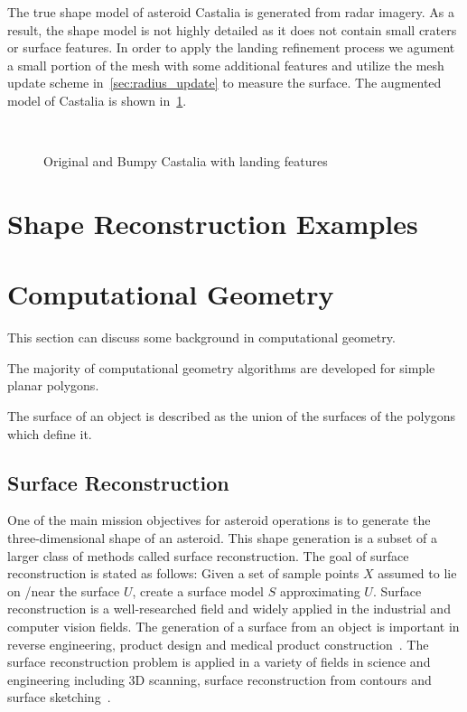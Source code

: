 The true shape model of asteroid Castalia is generated from radar imagery.
As a result, the shape model is not highly detailed as it does not contain small craters or surface features.
In order to apply the landing refinement process we agument a small portion of the mesh with some additional features and utilize the mesh update scheme in~\cref{sec:radius_update} to measure the surface.
The augmented model of Castalia is shown in~\cref{fig:bumpy_castalia}.
\begin{figure}[htbp]
    \centering
    ~
    \caption{Original and Bumpy Castalia with landing features~\label{fig:bumpy_castalia}}
\end{figure}

\section{Shape Reconstruction Examples}





\section{Computational Geometry}

This section can discuss some background in computational geometry.

The majority of computational geometry algorithms are developed for simple planar \glspl{polygon}.

The surface of an object is described as the union of the surfaces of the polygons which define it.


\subsection{Surface Reconstruction}
One of the main mission objectives for asteroid operations is to generate the three-dimensional shape of an asteroid.
This shape generation is a subset of a larger class of methods called surface reconstruction.
The goal of surface reconstruction is stated as follows: Given a set of sample points \( X\) assumed to lie on /near the surface \( U \), create a surface model \( S \) approximating \( U \).
Surface reconstruction is a well-researched field and widely applied in the industrial and computer vision fields.
The generation of a surface from an object is important in reverse engineering, product design and medical product construction~\cite{amenta2001}.
The surface reconstruction problem is applied in a variety of fields in science and engineering including 3D scanning, surface reconstruction from contours and surface sketching~\cite{hoppe1992}.


